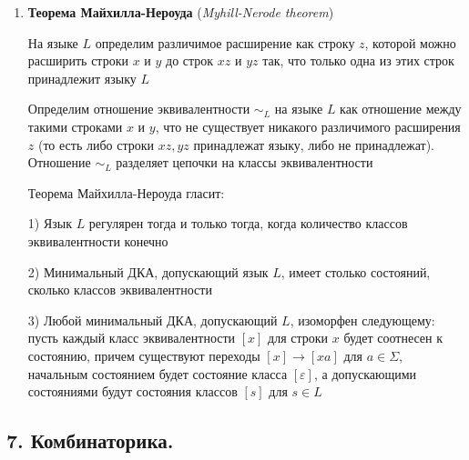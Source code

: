 \documentclass[12pt]{article}
\begin{document}
\begin{enumerate}
\begin{minipage}{\linewidth}
        \end{minipage}

        \smallvspace

        \item \textbf{Теорема Майхилла-Нероуда} (\textit{Myhill-Nerode theorem})

        На языке $L$ определим различимое расширение как строку $z$, которой можно расширить строки $x$ и $y$ до строк $xz$ и $yz$ так, что
        только одна из этих строк принадлежит языку $L$

        Определим отношение эквивалентности $\sim_L$ на языке $L$ как отношение между такими строками $x$ и $y$,
        что не существует никакого различимого расширения $z$ (то есть либо строки $xz, yz$ принадлежат языку, либо не принадлежат).
        Отношение $\sim_L$ разделяет цепочки на классы эквивалентности

        Теорема Майхилла-Нероуда гласит:

        1) Язык $L$ регулярен тогда и только тогда, когда количество классов эквивалентности конечно

        2) Минимальный ДКА, допускающий язык $L$, имеет столько состояний, сколько классов эквивалентности

        3) Любой минимальный ДКА, допускающий $L$, изоморфен следующему:
        пусть каждый класс эквивалентности $[x]$ для строки $x$ будет соотнесен к состоянию, причем существуют переходы $[x] \to [xa]$ для $a \in \Sigma$,
        начальным состоянием будет состояние класса $[\varepsilon]$, а допускающими состояниями будут состояния классов $[s]$ для $s \in L$


    \end{enumerate}

    \subsection{7. Комбинаторика.}
\end{document}

